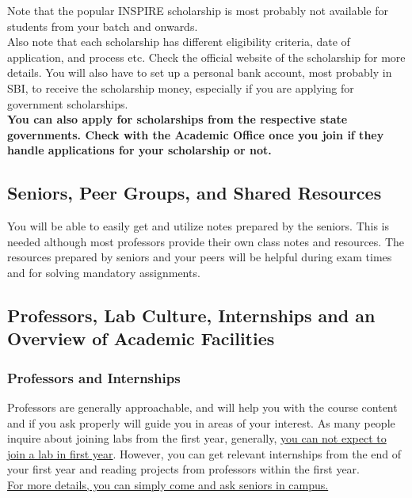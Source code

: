 \documentclass[openany]{book}
\begin{document}
\begin{mynote}
    Note that the popular INSPIRE scholarship is most probably not available for students from your batch and onwards. \\
    Also note that each scholarship has different eligibility criteria, date of application, and process etc. Check the official website of the scholarship for more details. You will also have to set up a personal bank account, most probably in SBI, to receive the scholarship money, especially if you are applying for government scholarships. \\
    \textbf{You can also apply for scholarships from the respective state governments. Check with the Academic Office once you join if they handle applications for your scholarship or not.} 
\end{mynote}

\subsection{Seniors, Peer Groups, and Shared Resources}
You will be able to easily get and utilize notes prepared by the seniors. This is needed although most professors provide their own class notes and resources. The resources prepared by seniors and your peers will be helpful during exam times and for solving mandatory assignments.
\subsection{Professors, Lab Culture, Internships and an Overview of Academic Facilities}
\subsubsection{Professors and Internships} 
Professors are generally approachable, and will help you with the course content and if you ask properly will guide you in areas of your interest. As many people inquire about joining labs from the first year, generally, \underline{you can not expect to join a lab in first year}. However, you can get relevant internships from the end of your first year and reading projects from professors within the first year. \\
\underline{For more details, you can simply come and ask seniors in campus.}
\end{document}
